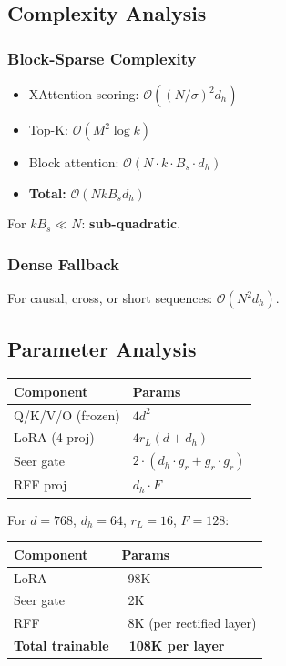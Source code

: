 \subsection{Complexity Analysis}

\subsubsection{Block-Sparse Complexity}

\begin{itemize}
\item XAttention scoring: $\mathcal{O}((N/\sigma)^2 d_h)$
\item Top-K: $\mathcal{O}(M^2 \log k)$
\item Block attention: $\mathcal{O}(N \cdot k \cdot B_s \cdot d_h)$
\item \textbf{Total:} $\mathcal{O}(N k B_s d_h)$

\end{itemize}
For $k B_s \ll N$: \textbf{sub-quadratic}.

\subsubsection{Dense Fallback}

For causal, cross, or short sequences: $\mathcal{O}(N^2 d_h)$.

\subsection{Parameter Analysis}

\begin{table}[H]
\centering
\small
\begin{tabular}{ll}
\toprule
\textbf{Component} & \textbf{Params} \\
\midrule
Q/K/V/O (frozen) & $4 d^2$ \\
LoRA (4 proj) & $4 r_L (d + d_h)$ \\
Seer gate & $2 \cdot (d_h \cdot g_r + g_r \cdot g_r)$ \\
RFF proj & $d_h \cdot F$ \\
\bottomrule
\end{tabular}
\end{table}

For $d = 768$, $d_h = 64$, $r_L = 16$, $F = 128$:

\begin{table}[H]
\centering
\small
\begin{tabular}{ll}
\toprule
\textbf{Component} & \textbf{Params} \\
\midrule
LoRA & ~98K \\
Seer gate & ~2K \\
RFF & ~8K (per rectified layer) \\
\textbf{Total trainable} & \textbf{~108K per layer} \\
\bottomrule
\end{tabular}
\end{table}


